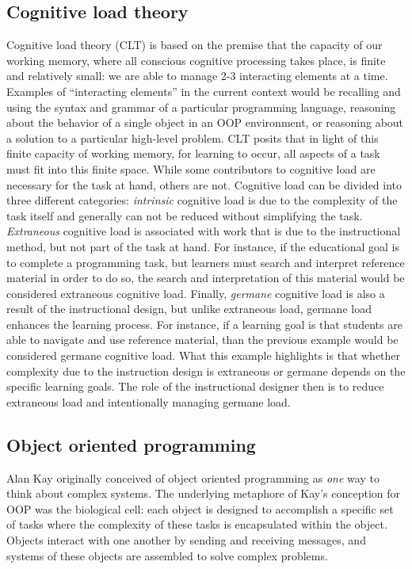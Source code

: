 \documentclass[12pt]{article}
\begin{document}
\subsection*{Cognitive load theory}
Cognitive load theory (CLT) is based on the premise that the capacity
of our working memory, where all conscious cognitive processing takes
place, is finite and relatively small: we are able to manage 2-3
interacting elements at a time. Examples of ``interacting elements''
in the current context would be recalling and using the syntax and
grammar of a particular programming language, reasoning about the
behavior of a single object in an OOP environment, or reasoning about
a solution to a particular high-level problem. CLT posits that in
light of this finite capacity of working memory, for learning to
occur, all aspects of a task must fit into this finite space. While
some contributors to cognitive load are necessary for the task at
hand, others are not\autocite{paas_cognitive_2003}. Cognitive load can
be divided into three different categories: \emph{intrinsic} cognitive
load is due to the complexity of the task itself and generally can not
be reduced without simplifying the task. \emph{Extraneous} cognitive
load is associated with work that is due to the instructional method,
but not part of the task at hand. For instance, if the educational
goal is to complete a programming task, but learners must search and
interpret reference material in order to do so, the search and
interpretation of this material would be considered extraneous
cognitive load. Finally, \emph{germane} cognitive load is also a
result of the instructional design, but unlike extraneous load,
germane load enhances the learning process. For instance, if a
learning goal is that students are able to navigate and use reference
material, than the previous example would be considered germane
cognitive load. What this example highlights is that whether
complexity due to the instruction design is extraneous or germane
depends on the specific learning goals. The role of the instructional
designer then is to reduce extraneous load and intentionally managing
germane load.

\subsection*{Object oriented programming}
Alan Kay originally conceived of object oriented programming as
\emph{one} way to think about complex
systems\autocite{kay_history_1996}. The underlying metaphore of Kay's
conception for OOP was the biological cell: each object is
designed to accomplish a specific set of tasks where the complexity of
these tasks is encapsulated within the object. Objects interact with
one another by sending and receiving messages, and systems of these
objects are assembled to solve complex
problems\autocite{kay_history_1996}.
\end{document}
